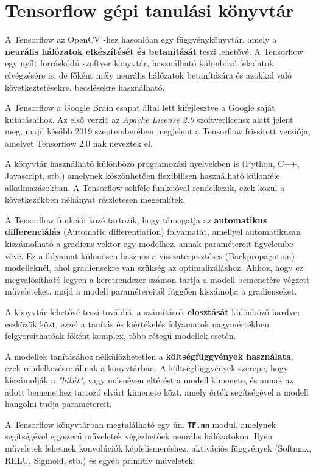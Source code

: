 \section{Tensorflow gépi tanulási könyvtár}
A Tensorflow az OpenCV -hez hasonlóan egy függvénykönyvtár, amely a \textbf{neurális hálózatok elkészítését és betanítását} teszi lehetővé. A Tensorflow egy nyílt forráskódú szoftver könyvtár, használható különböző feladatok elvégzésére is, de főként mély neurális hálózatok betanítására és azokkal való következtetésekre, becslésekre használható. \cite{tensorflow2015-whitepaper}
\par A Tensorflow a Google Brain csapat által lett kifejlesztve a Google saját kutatásaihoz. Az első verzió az \textit{Apache License 2.0} szoftverlicensz alatt jelent meg, majd később 2019 szeptemberében megjelent a Tensorflow frissített verziója, amelyet Tensorflow 2.0 nak neveztek el.\cite{tensorflow2015-whitepaper}
\par A könyvtár használható különböző programozási nyelvekben is (Python, C++, Javascript, stb.) amelynek köszönhetően flexibilisen használható külonféle alkalmazásokban. A Tensorflow sokféle funkcióval rendelkezik, ezek közül a következőkben néhányat részletesen megemlítek.
\par A Tensorflow funkciói közé tartozik, hogy támogatja az \textbf{automatikus differenciálás} (Automatic differentiation) folyamatát, amellyel automatikusan kiszámolható a gradiens vektor egy modelhez, annak paramétereit figyelembe véve. Ez a folyamat különösen hasznos a visszaterjesztéses (Backpropagation) modelleknél, ahol gradiensekre van szükség az optimalizáláshoz. Ahhoz, hogy ez megvalósítható legyen a keretrendszer számon tartja a modell bemenetére végzett műveleteket, majd a modell paramétereitől függően kiszámolja a gradienseket. \cite{tensorflow2015-whitepaper,tensorflow_autodiff}
\par A könyvtár lehetővé teszi továbbá, a számítások \textbf{elosztását} különböző hardver eszközök közt, ezzel a tanítás és kiértékelés folyamatok nagymértékben felgyorsíthatóak főként komplex, több rétegű modellek esetén.\cite{tensorflow2015-whitepaper}
\par A modellek tanításához nélkülözhetetlen a \textbf{költségfüggvények használata}, ezek rendelkezésre állnak a könyvtárban. A költségfüggvények szerepe, hogy kiszámolják a \textit{"hibát"}, vagy másnéven eltérést a modell kimenete, és annak az adott bemenethez tartozó elvárt kimenete közt, amely érték segítségével a modell hangolni tudja paramétereit.
\par A Tensorflow könyvtárban megtalálható egy ún. \textbf{\lstinline{TF.nn}} modul, amelynek segítségével egyszerű műveletek végezhetőek neurális hálózatokon. Ilyen műveletek lehetnek konvolúciók képfelismeréshez, aktivációs függvények (Softmax, RELU, Sigmoid, stb.) és egyéb primitív műveletek.
